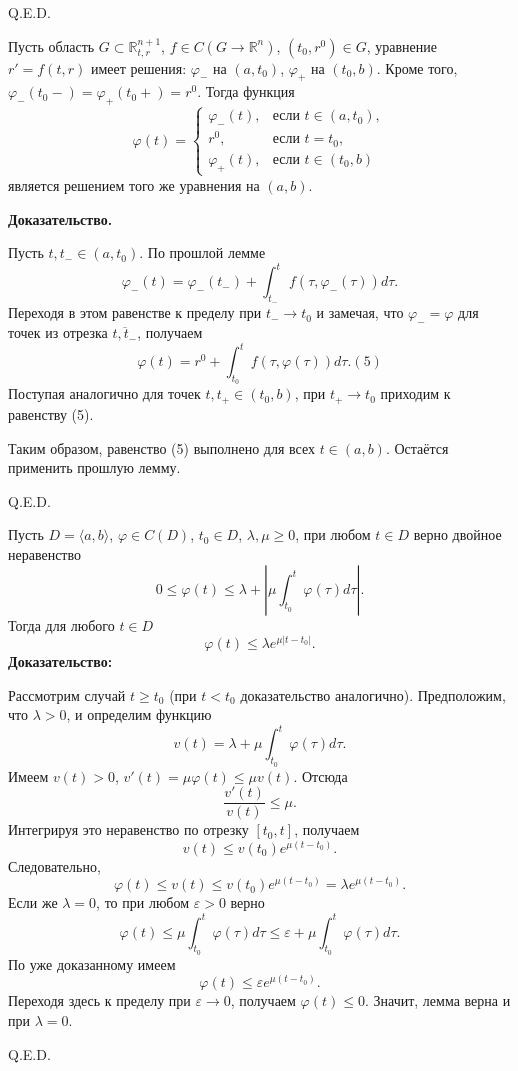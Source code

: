 \hfill Q.E.D.



Пусть область $G \subset \mathbb{R}_{t,r}^{n+1}$, $f \in C(G \rightarrow \mathbb{R}^n)$, $(t_0, r^0) \in G$, уравнение $r' = f(t, r)$ имеет решения: $\varphi_-$ на $(a, t_0)$, $\varphi_+$ на $(t_0, b)$. Кроме того, $\varphi_-(t_0 -) = \varphi_+(t_0 +) = r^0$. Тогда функция
$$\varphi(t) =
\begin{cases}
\varphi_-(t), & \text{если } t \in (a, t_0), \\
r^0, & \text{если } t = t_0, \\
\varphi_+(t), & \text{если } t \in (t_0, b)
\end{cases}$$
является решением того же уравнения на $(a, b)$.

\textbf{Доказательство.}

Пусть $t, t_- \in (a, t_0)$. По прошлой лемме 
$$\varphi_-(t) = \varphi_-(t_-) + \int_{t_-}^t f(\tau, \varphi_-(\tau)) d\tau.$$
Переходя в этом равенстве к пределу при $t_- \rightarrow t_0$ и замечая, что $\varphi_- = \varphi$ для точек из отрезка $\overline{t, t_{-}}$, получаем
$$\varphi(t) = r^0 + \int_{t_0}^t f(\tau, \varphi(\tau)) d\tau. (5)$$
Поступая аналогично для точек $t, t_+ \in (t_0, b)$, при $t_+ \rightarrow t_0$ приходим к равенству (5).

Таким образом, равенство (5) выполнено для всех $t \in (a, b)$. Остаётся применить прошлую лемму.

\hfill Q.E.D.


Пусть $D = \langle a, b\rangle$, $\varphi \in C(D)$, $t_0 \in D$, $\lambda, \mu \geq 0$, при любом $t \in D$ верно двойное неравенство
$$0 \leq \varphi(t) \leq \lambda + \left|\mu \int_{t_0}^t \varphi(\tau) d\tau \right|.$$
Тогда для любого $t \in D$
$$\varphi(t) \leq \lambda e^{\mu |t - t_0|}.$$
\textbf{Доказательство:}

Рассмотрим случай $t \geq t_0$ (при $t < t_0$ доказательство аналогично). Предположим, что $\lambda > 0$, и определим функцию
$$v(t) = \lambda + \mu \int_{t_0}^t \varphi(\tau) d\tau.$$
Имеем $v(t) > 0$, $v'(t) = \mu \varphi(t) \leq \mu v(t)$. Отсюда
$$\frac{v'(t)}{v(t)} \leq \mu.$$
Интегрируя это неравенство по отрезку $[t_0, t]$, получаем
$$v(t) \leq v(t_0) e^{\mu(t - t_0)}.$$
Следовательно,
$$\varphi(t) \leq v(t) \leq v(t_0) e^{\mu(t - t_0)} = \lambda e^{\mu(t - t_0)}.$$
Если же $\lambda = 0$, то при любом $\varepsilon > 0$ верно
$$
\varphi(t) \leq \mu \int_{t_0}^t \varphi(\tau) d\tau \leq \varepsilon + \mu \int_{t_0}^t \varphi(\tau) d\tau.
$$
По уже доказанному имеем
$$\varphi(t) \leq \varepsilon e^{\mu (t - t_0)}.$$
Переходя здесь к пределу при $\varepsilon \rightarrow 0$, получаем $\varphi(t) \leq 0$. Значит, лемма верна и при $\lambda = 0$.

\hfill Q.E.D.